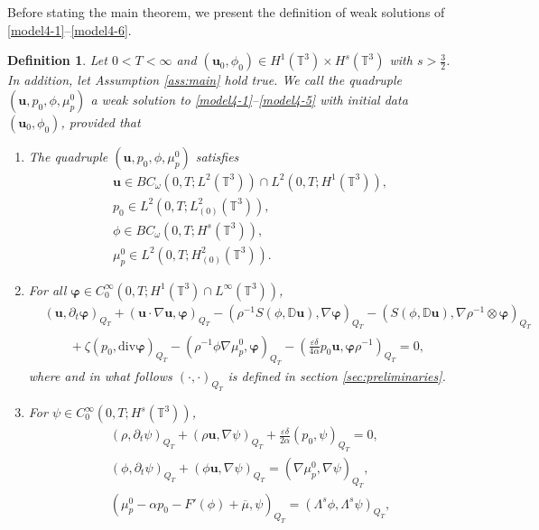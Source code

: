 \documentclass[reqno,a4paper,11pt]{amsart}
\theoremstyle{plain}
\newtheorem{definition}[theorem]{Definition}
\numberwithin{equation}{section}
\newcommand{\bb}[1]{\mathbb{#1}}
\newcommand{\bbt}{\bb{T}}
\newcommand{\bu}{\mathbf{u}}
\begin{document}
Before stating the main theorem, we present the definition of weak solutions of \eqref{model4-1}--\eqref{model4-6}.
\begin{definition}\label{appro;def}
	Let $0<T < \infty$ and $ (\bu_0,\phi_0) \in H^1(\bbt^3) \times H^s(\bbt^3) $ with $s>\frac{3}{2}$.
	In addition, let Assumption \ref{ass:main} hold true. We call the quadruple $(\bu,p_0,\phi,\mu_p^0)$ a weak solution to \eqref{model4-1}--\eqref{model4-5} with initial data $(\bu_0,\phi_0)$, provided that	
	\begin{enumerate}
		\item The quadruple $(\bu,p_0,\phi,\mu_p^0)$ satisfies
		\begin{align*}
			&\mathbf{u}\in BC_{\omega}(0,T; L^{2}(\mathbb{T}^{3}))\cap L^{2}(0,T; H^{1}(\mathbb{T}^{3})),
			\\& p_{0}\in L^{2}(0,T; L^{2}_{(0)}(\mathbb{T}^{3})),
			\\&\phi\in BC_{\omega}(0,T; H^{s}(\mathbb{T}^{3})),
			\\& \mu_{p}^{0}\in L^{2}(0,T; H^{2}_{(0)}(\mathbb{T}^{3})).
		\end{align*}
		\item For all  $\boldsymbol{\varphi}\in C_{0}^{\infty}(0,T;H^1(\bbt^3) \cap L^{\infty}(\mathbb{T}^{3}))$,
		\begin{align}\label{weak1}
			&\nonumber(\mathbf{u},\partial_{t}\boldsymbol{\varphi})_{Q_{T}}+(\mathbf{u}\cdot\nabla\mathbf{u},\boldsymbol{\varphi})_{Q_{T}}-(\rho^{-1}S(\phi,\mathbb{ D}\mathbf{u}),\nabla\boldsymbol{\varphi})_{Q_{T}}-(S(\phi,\mathbb{ D}\mathbf{u}),\nabla\rho^{-1}\otimes\boldsymbol{\varphi})_{Q_{T}}
			\\&\qquad
			+\zeta(p_{0},\mathrm{div}\boldsymbol{\varphi})_{Q_{T}}-(\rho^{-1}\phi \nabla \mu_{p}^{0},\boldsymbol{\varphi})_{Q_{T}}
			-(\frac{\varepsilon\delta}{4\alpha}  p_{0} \mathbf{u},\boldsymbol{\varphi}\rho^{-1})_{Q_{T}}=0,
		\end{align}
		where and in what follows $(\cdot,\cdot)_{Q_{T}}$ is defined in section \ref{sec:preliminaries}.
		\item For  $\psi\in C_{0}^{\infty}(0,T; H^{s}(\mathbb{T}^{3}))$,
		\begin{align}
			&\label{weak2}
			(\rho,\partial_{t}\psi)_{Q_{T}}+(\rho\mathbf{u}, \nabla\psi)_{Q_{T}}+\frac{\varepsilon\delta}{2\alpha}( p_{0},\psi)_{Q_{T}}=0,
			\\&\label{weak3}(\phi,\partial_{t}\psi)_{Q_{T}}+(\phi\mathbf{u},\nabla\psi)_{Q_{T}}=( \nabla \mu_{p}^{0},\nabla\psi)_{Q_{T}},
			\\&\label{weak4}(\mu_{p}^{0}-\alpha p_{0}-F'(\phi)+\overline{\mu},\psi)_{Q_{T}}=(\Lambda^{s}\phi,\Lambda^{s}\psi)_{Q_{T}},

\end{align}
\end{enumerate}
\end{definition}
\end{document}
